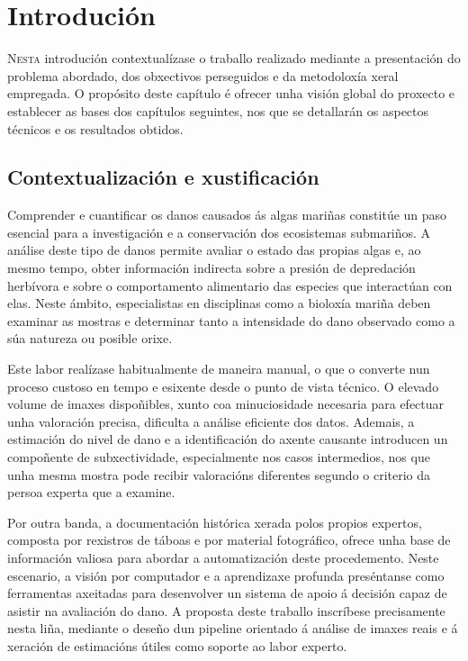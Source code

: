 \chapter{Introdución}
\label{chap:introducion}

\lettrine{N}{esta} introdución contextualízase o traballo realizado mediante a presentación do
problema abordado, dos obxectivos perseguidos e da metodoloxía xeral empregada. O propósito deste
capítulo é ofrecer unha visión global do proxecto e establecer as bases dos capítulos seguintes,
nos que se detallarán os aspectos técnicos e os resultados obtidos.

\section{Contextualización e xustificación}
Comprender e cuantificar os danos causados ás algas mariñas constitúe un paso esencial para a
investigación e a conservación dos ecosistemas submariños. A análise deste tipo de danos permite
avaliar o estado das propias algas e, ao mesmo tempo, obter información indirecta sobre a presión de
depredación herbívora e sobre o comportamento alimentario das especies que interactúan con elas.
Neste ámbito, especialistas en disciplinas como a bioloxía mariña deben examinar as mostras e
determinar tanto a intensidade do dano observado como a súa natureza ou posible orixe.

Este labor realízase habitualmente de maneira manual, o que o converte nun proceso custoso en
tempo e esixente desde o punto de vista técnico. O elevado volume de imaxes dispoñibles, xunto coa
minuciosidade necesaria para efectuar unha valoración precisa, dificulta a análise eficiente dos
datos. Ademais, a estimación do nivel de dano e a identificación do axente causante introducen un
compoñente de subxectividade, especialmente nos casos intermedios, nos que unha mesma mostra pode
recibir valoracións diferentes segundo o criterio da persoa experta que a examine.

Por outra banda, a documentación histórica xerada polos propios expertos, composta por rexistros
de táboas e por material fotográfico, ofrece unha base de información valiosa para abordar a
automatización deste procedemento. Neste escenario, a visión por computador e a aprendizaxe profunda
preséntanse como ferramentas axeitadas para desenvolver un sistema de apoio á decisión capaz de
asistir na avaliación do dano. A proposta deste traballo inscríbese precisamente nesta liña, mediante
o deseño dun pipeline orientado á análise de imaxes reais e á xeración de estimacións útiles como
soporte ao labor experto.

